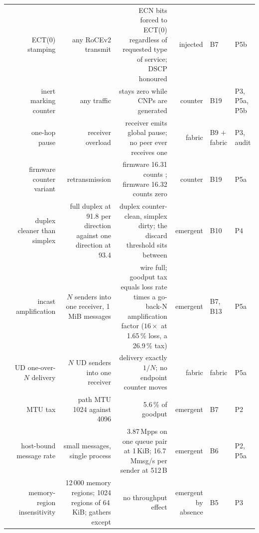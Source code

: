 \begin{table}[t]
\begin{tabular}{@{}l R{0.115} R{0.185} R{0.30} R{0.065} l l@{}}
     & ECT(0) stamping &
    any RoCEv2 transmit &
    ECN bits forced to ECT(0) regardless of requested type of service; DSCP
    honoured &
    injected & B7 & P5b \\

     & inert marking counter &
    any traffic &
     stays zero while CNPs are generated &
    counter & B19 & P3, P5a, P5b \\

     & one-hop pause &
    receiver overload &
    receiver emits global pause; no peer ever receives one &
    fabric & B9 $+$ fabric & P3, audit \\

     & firmware counter variant &
    retransmission &
    firmware 16.31 counts ; firmware 16.32
    counts zero &
    counter & B19 & P5a \\

     & duplex cleaner than simplex &
    full duplex at 91.8\Gbps{} per direction against one direction at
    93.4\Gbps{} &
    duplex counter-clean, simplex dirty; the discard threshold sits between &
    emergent & B10 & P4 \\

     & incast amplification &
    $N$ senders into one receiver, 1\,MiB messages &
    wire full; goodput tax equals loss rate times a go-back-N amplification
    factor ($16\times$ at 1.65\,\% loss, a 26.9\,\% tax) &
    emergent & B7, B13 & P5a \\

     & UD one-over-$N$ delivery &
    $N$ UD senders into one receiver &
    delivery exactly $1/N$; no endpoint counter moves &
    fabric & fabric & P5a \\

     & MTU tax &
    path MTU 1024 against 4096 &
    5.6\,\% of goodput &
    emergent & B7 & P2 \\

     & host-bound message rate &
    small messages, single process &
    3.87\,Mpps on one queue pair at 1\,KiB; 16.7\,Mmsg/s per sender at 512\,B &
    emergent & B6 & P2, P5a \\

     & memory-region insensitivity &
    12\,000 memory regions; 1024 regions of 64\,KiB; gathers except  &
    no throughput effect &
    emergent by absence & B5 & P3 \\


\end{tabular}
\end{table}
